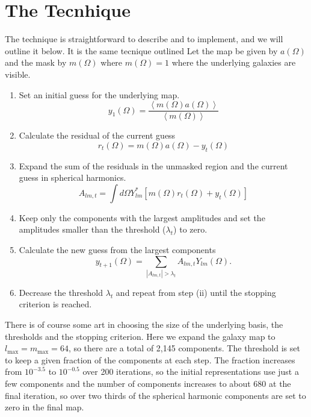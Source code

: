 \documentclass[useAMS,usenatbib]{mn2e}
\begin{document}
\section{The Tecnhique}
\label{sec:tecnhique}
The technique is straightforward to describe and to implement, and we
will outline it below.  It is the same tecnique outlined  Let the map be given by $a(\Omega)$ and the
mask by $m(\Omega)$ where $m(\Omega)=1$ where the underlying galaxies
are visible.
\begin{enumerate}
\item
  Set an initial guess for the underlying map.
\begin{equation}
  y_1(\Omega) = \frac{\left \langle  m(\Omega) a(\Omega)  \right \rangle}{\left \langle m(\Omega) \right \rangle }
    \label{eq:2}
\end{equation}
\item
  Calculate the residual of the current guess
  \begin{equation}
    r_t(\Omega) =  m(\Omega) a(\Omega) - y_t(\Omega)
    \label{eq:3}
  \end{equation}
\item
  Expand the sum of the residuals in the unmasked region and the current guess
  in spherical harmonics.
  \begin{equation}
    A_{lm,t} = \int d\Omega Y^*_{lm} \left [ m(\Omega) r_t(\Omega) + y_t(\Omega) \right ]
    \label{eq:4}
  \end{equation}
\item
  Keep only the components with the largest amplitudes and set the
  amplitudes smaller than the threshold ($\lambda_t$) to zero.
\item
  Calculate the new guess from the largest components
  \begin{equation}
    y_{t+1}(\Omega) = \sum_{|A_{lm,t}| > \lambda_t} A_{lm,t} Y_{lm}(\Omega).
    \label{eq:5}
  \end{equation}
\item
  Decrease the threshold $\lambda_t$ and repeat from step (ii) until the stopping criterion
  is reached.
\end{enumerate}
There is of course some art in choosing the size of the underlying
basis, the thresholds and the stopping criterion.  Here we expand the
galaxy map to $l_\mathrm{max}=m_\mathrm{max}=64$, so there are a total
of 2,145 components.  The threshold is set to keep a given fraction of
the components at each step.  The fraction increases from $10^{-3.5}$
to $10^{-0.5}$ over 200 iterations, so the initial representations use
just a few components and the number of components increases to about
680 at the final iteration, so over two thirds of the spherical
harmonic components are set to zero in the final map.
\end{document}
